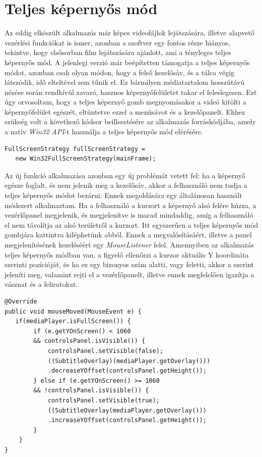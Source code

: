 \section{Teljes képernyős mód}

Az eddig elkészült alkalmazás már képes videofájlok lejátszására, illetve alapvető vezérlési funkciókat is ismer, azonban a szoftver egy fontos része hiányos, tekintve, hogy elsősorban film lejátszására ajánlott, ami a tényleges teljes képernyős mód. A jelenlegi verzió már beépítetten támogatja a teljes képernyős módot, azonban csak olyan módon, hogy a felső kezelősáv, és a tálca végig látszódik, idő elteltével sem tűnik el. Ez bármilyen médiatartalom hosszútávú nézése során rendkívül zavaró, hasznos képernyőfelületet takar el feleslegesen. Ezt úgy orvosoltam, hogy a teljes képernyő gomb megnyomásakor a videó kitölti a képernyőfelület egészét, eltüntetve ezzel a menüsávot és a kezelőpanelt. Ehhez szükség volt a következő kódsor beillesztésére az alkalmazás forráskódjába, amely a natív \textit{Win32 API}-t használja a teljes képernyős mód elérésére.

\begin{verbatim}
FullScreenStrategy fullScreenStrategy =
   new Win32FullScreenStrategy(mainFrame);
\end{verbatim}

Az új funkció alkalmazása azonban egy új problémát vetett fel: ha a képernyő egésze foglalt, és nem jelenik meg a kezelősáv, akkor a felhasználó nem tudja a teljes képernyős módot bezárni. Ennek megoldására egy általánosan használt módszert alkalmaztam. Ha a felhasználó a kurzort a képernyő alsó felére húzza, a vezérlőpanel megjelenik, és megjelenítve is marad mindaddig, amíg a felhasználó el nem távolítja az alsó területről a kurzort. Itt egyszerűen a teljes képernyős mód gombjára kattintva kiléphetünk abból. Ennek a megvalósításáért, illetve a panel megjelenítésének kezeléséért egy \textit{MouseListener} felel. Amennyiben az alkalmazás teljes képernyős módban van, a figyelő ellenőrzi a kurzor aktuális Y koordináta szerinti pozícióját, és ha ez egy bizonyos szám alatti, vagy feletti, akkor a szerint jeleníti meg, valamint rejti el a vezérlőpanelt, illetve ennek megfelelően igazítja a vásznat és a feliratokat.

\begin{verbatim}
@Override
public void mouseMoved(MouseEvent e) {
   if(mediaPlayer.isFullScreen()) {
        if (e.getYOnScreen() < 1060
        && controlsPanel.isVisible()) {
            controlsPanel.setVisible(false);
            ((SubtitleOverlay)(mediaPlayer.getOverlay()))
            .decreaseYOffset(controlsPanel.getHeight());
        } else if (e.getYOnScreen() >= 1060
        && !controlsPanel.isVisible()) {
            controlsPanel.setVisible(true);
            ((SubtitleOverlay(mediaPlayer.getOverlay()))
            .increaseYOffset(controlsPanel.getHeight());
        }
    }
}
\end{verbatim}

